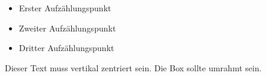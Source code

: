 \documentclass[a3paper,13pt,rgb]{tubsposter}
\begin{document}
\begin{gausspage}[sender=bottom,bgcolor=tuOrange]
  \showtubslogo[right]
  
  \begin{segment}[bgimage=infozentrum.jpg,imagefit=vclip]{4}
  \end{segment}
  \itemsep0mm
  \begin{segment}[bgcolor=tuViolet,fgcolor=tuWhite]{2}
    \begin{itemize}
      \item Erster Aufzählungspunkt
      \item Zweiter Aufzählungspunkt
      \item Dritter Aufzählungspunkt
    \end{itemize}
  \end{segment}
  \begin{segment}[c,bgcolor=tuOrange,fgcolor=tuWhite,frame=fbox]{1}
    Dieser Text muss vertikal zentriert sein. Die Box sollte umrahmt sein.
  \end{segment}
  \begin{segment}[bgcolor=tuGreenLight]{1}
  \end{segment}
\end{gausspage}
\end{document}
